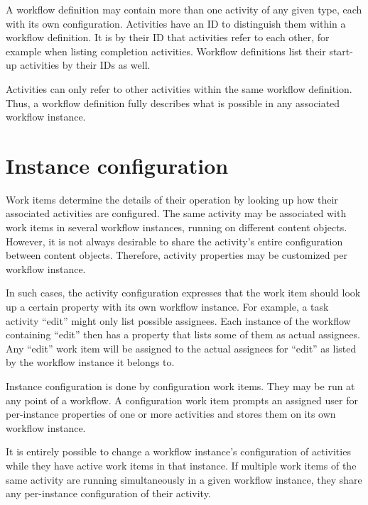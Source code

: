 A workflow definition may contain more than one activity of any given type,
each with its own configuration. Activities have an ID to distinguish them
within a workflow definition. It is by their ID that activities refer to each
other, for example when listing completion activities. Workflow definitions
list their start-up activities by their IDs as well.

Activities can only refer to other activities within the same workflow
definition.  Thus, a workflow definition fully describes what is possible in
any associated workflow instance.

\section{Instance configuration}

Work items determine the details of their operation by looking up how their
associated activities are configured. The same activity may be associated with
work items in several workflow instances, running on different content
objects. However, it is not always desirable to share the activity's entire
configuration between content objects. Therefore, activity properties may be
customized per workflow instance.

In such cases, the activity configuration expresses that the work item should
look up a certain property with its own workflow instance. For example, a task
activity ``edit'' might only list possible assignees. Each instance of the
workflow containing ``edit'' then has a property that lists some of them as
actual assignees. Any ``edit'' work item will be assigned to the actual
assignees for ``edit'' as listed by the workflow instance it belongs to.

Instance configuration is done by configuration work items. They may be run at
any point of a workflow. A configuration work item prompts an assigned user
for per-instance properties of one or more activities and stores them on its
own workflow instance.

It is entirely possible to change a workflow instance's configuration of
activities while they have active work items in that instance. If multiple
work items of the same activity are running simultaneously in a given workflow
instance, they share any per-instance configuration of their activity.
